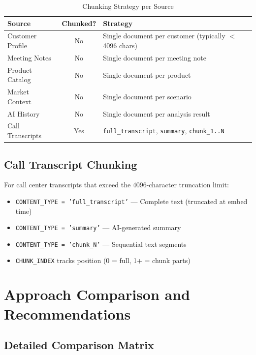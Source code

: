 \documentclass[12pt,a4paper]{article}
\begin{document}
\begin{table}[H]
\centering
\caption{Chunking Strategy per Source}
\begin{tabularx}{\textwidth}{l c X}
\toprule
\textbf{Source} & \textbf{Chunked?} & \textbf{Strategy} \\
\midrule
Customer Profile & No & Single document per customer (typically $<$ 4096 chars) \\
Meeting Notes & No & Single document per meeting note \\
Product Catalog & No & Single document per product \\
Market Context & No & Single document per scenario \\
AI History & No & Single document per analysis result \\
Call Transcripts & Yes & \texttt{full\_transcript}, \texttt{summary}, \texttt{chunk\_1..N} \\
\bottomrule
\end{tabularx}
\end{table}

\subsection{Call Transcript Chunking}

For call center transcripts that exceed the 4096-character truncation limit:

\begin{itemize}
  \item \texttt{CONTENT\_TYPE = 'full\_transcript'} — Complete text (truncated at embed time)
  \item \texttt{CONTENT\_TYPE = 'summary'} — AI-generated summary
  \item \texttt{CONTENT\_TYPE = 'chunk\_N'} — Sequential text segments
  \item \texttt{CHUNK\_INDEX} tracks position (0 = full, 1+ = chunk parts)
\end{itemize}

\section{Approach Comparison and Recommendations}
\label{sec:comparison}

\subsection{Detailed Comparison Matrix}
\end{document}

